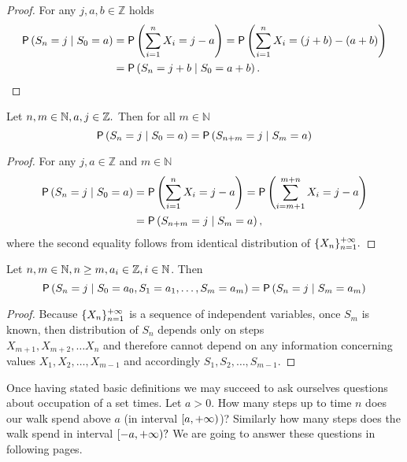 \begin{proof} For any $j, a, b \in \mathbb Z$ holds
  \[
    \begin{split}
      \pr \left( S_n=j \mid S_0=a \right) & =\pr \left( \suma X_i=j-a
      \right)
      =\pr \left( \suma X_i= \left( j+b \right) - \left( a+b \right) \right) \\
      & =\pr \left( S_n=j+b \mid S_0=a+b \right).
    \end{split}
 \]
\end{proof}


\begin{lemma}\label{lemma-temporal_homogeneity}
  Let $n,m \in \mathbb{N}, a,j \in \mathbb{Z}.$ Then for all $m \in \mathbb N$
   \[
     \operatorname{\mathsf{P}} \left( S_n=j \mid S_0=a \right) =\operatorname{\mathsf{P}} \left( S_{n+m}=j \mid
       S_m=a \right)
   \]
\end{lemma}
\begin{proof} For any $j, a \in \mathbb Z$ and $m \in \mathbb N$
  \[
    \begin{split}
      \pr \left( S_n=j \mid S_0=a \right) & =\pr \left( \suma X_i=j-a\right)
      =\pr \left( \suma[i][m+1][m+n]X_i=j-a \right)\\
      & =\pr \left( S_{n+m}=j \mid S_m=a \right),
    \end{split}
  \]
where the second equality follows from identical distribution of
$\{X_n\}_{n=1}^{{+\infty}}.$
\end{proof}

\begin{lemma}\label{lemma-markov_property}
 Let $n,m \in \mathbb{N}, n\geq m, a_i \in \mathbb{Z}, i\in \mathbb{N}$. Then
 \[
     \operatorname{\mathsf{P}} \left( S_n=j \mid S_0=a_0, S_1=a_1, \ldots, S_m=a_m \right)
     =\operatorname{\mathsf{P}} \left( S_n=j \mid S_m=a_m \right)
 \]
\end{lemma}
\begin{proof}
 Because $\{X_n\}_{n=1}^{+\infty}$ is a sequence of independent variables, once $S_m$ is known, then distribution of $S_n$ depends only on steps ~\\$X_{m+1}, X_{m+2}, \ldots X_n$ and therefore cannot depend on any information concerning values $X_1, X_2, \ldots, X_{m-1}$ and accordingly $S_1, S_2, \ldots, S_{m-1}.$
\end{proof}

\begin{rem}
  Once having stated basic definitions we may succeed to ask ourselves questions about occupation of a set times. Let $a>0$. How many steps up to time $n$ does our walk spend above $a$ (in interval $[a,{+\infty})$)? Similarly how many steps does the walk spend in interval $[-a,{+\infty})?$ We are going to answer these questions in following pages.
\end{rem}

